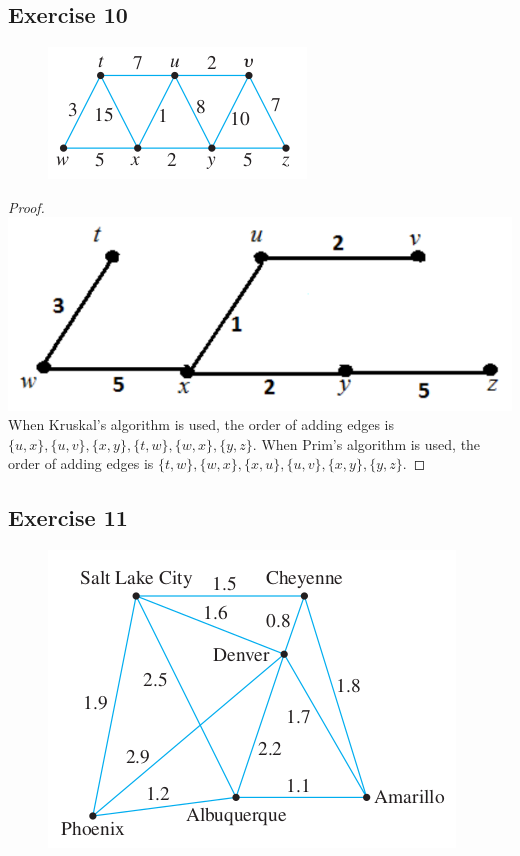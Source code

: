 \documentclass[14pt]{extarticle}
\begin{document}
\subsection{Exercise 10}
\begin{figure}[ht!]
\centering
\includegraphics[scale=0.5]{../images/10.6.10.png}
\end{figure}

\begin{proof}
\includegraphics[scale=0.3]{../images/10.6.10.2.png}
When Kruskal's algorithm is used, the order of adding edges is 
\(\{u, x\}, \{u, v\}, \{x, y\}, \{t, w\}, \{w, x\}, \{y, z\}\). When Prim's algorithm is used, the order of adding edges 
is \(\{t, w\}, \{w, x\}, \{x, u\}, \{u, v\}, \{x, y\}, \{y, z\}\).
\end{proof}

\subsection{Exercise 11}
\begin{figure}[ht!]
\centering
\includegraphics[scale=0.5]{../images/10.6.11.png}
\end{figure}
\end{document}
